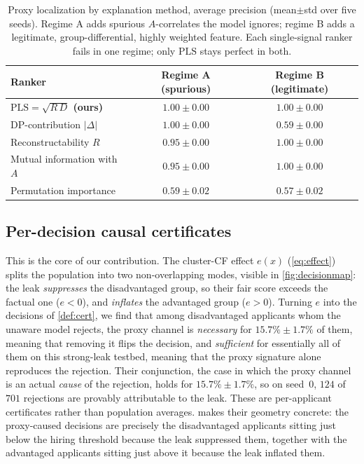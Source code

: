 \documentclass[sn-mathphys-num]{sn-jnl}
\newcommand{\PLS}{\mathrm{PLS}}
\begin{document}
\begin{table}[tbp]
\centering
\caption{Proxy localization by explanation method, average precision (mean$\pm$std
over five seeds). Regime A adds spurious $A$-correlates the model ignores; regime
B adds a legitimate, group-differential, highly weighted feature. Each
single-signal ranker fails in one regime; only $\PLS$ stays perfect in both.}
\label{tab:localizer}
\small
\begin{tabular}{lcc}
\toprule
Ranker & Regime A (spurious) & Regime B (legitimate)\\
\midrule
\textbf{$\PLS=\sqrt{R\,D}$ (ours)} & $\mathbf{1.00\pm0.00}$ & $\mathbf{1.00\pm0.00}$\\
DP-contribution $|\Delta|$ & $1.00\pm0.00$ & $0.59\pm0.00$\\
Reconstructability $R$ & $0.95\pm0.00$ & $1.00\pm0.00$\\
Mutual information with $A$ & $0.95\pm0.00$ & $1.00\pm0.00$\\
Permutation importance & $0.59\pm0.02$ & $0.57\pm0.02$\\
\bottomrule
\end{tabular}
\end{table}

\subsection{Per-decision causal certificates}
\label{sec:results-cert}
This is the core of our contribution. The cluster-CF effect $e(x)$
(\cref{eq:effect}) splits the population into two non-overlapping modes, visible
in \cref{fig:decisionmap}: the leak \emph{suppresses} the disadvantaged group, so
their fair score exceeds the factual one ($e<0$), and \emph{inflates} the
advantaged group ($e>0$). Turning $e$ into the decisions of \cref{def:cert}, we
find that among disadvantaged applicants whom the unaware model rejects, the
proxy channel is \emph{necessary} for $15.7\%\pm1.7\%$ of them, meaning that
removing it flips the decision, and \emph{sufficient} for essentially all of them
on this strong-leak testbed, meaning that the proxy signature alone reproduces
the rejection. Their conjunction, the case in which the proxy channel is an actual
\emph{cause} of the rejection, holds for $15.7\%\pm1.7\%$, so on seed~0, $124$ of
$701$ rejections are provably attributable to the leak. These are per-applicant
certificates rather than population averages.  makes their
geometry concrete: the proxy-caused decisions are precisely the disadvantaged
applicants sitting just below the hiring threshold because the leak suppressed
them, together with the advantaged applicants sitting just above it because the
leak inflated them.
\end{document}
